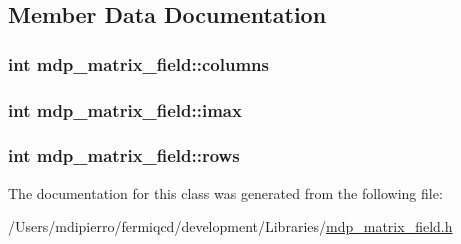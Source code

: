 \subsection{Member Data Documentation}
\hypertarget{classmdp__matrix__field_aed230e738036a9f78c46089fe3710a53}{
\subsubsection[{columns}]{\setlength{\rightskip}{0pt plus 5cm}int {\bf mdp\_\-matrix\_\-field::columns}}}
\label{classmdp__matrix__field_aed230e738036a9f78c46089fe3710a53}
\hypertarget{classmdp__matrix__field_a36e86a01ec41e2c0c67194091119c835}{
\subsubsection[{imax}]{\setlength{\rightskip}{0pt plus 5cm}int {\bf mdp\_\-matrix\_\-field::imax}}}
\label{classmdp__matrix__field_a36e86a01ec41e2c0c67194091119c835}
\hypertarget{classmdp__matrix__field_ac19f5807ad30e73c0362753a6b04c491}{
\subsubsection[{rows}]{\setlength{\rightskip}{0pt plus 5cm}int {\bf mdp\_\-matrix\_\-field::rows}}}
\label{classmdp__matrix__field_ac19f5807ad30e73c0362753a6b04c491}


The documentation for this class was generated from the following file:\begin{DoxyCompactItemize}
\item 
/Users/mdipierro/fermiqcd/development/Libraries/\hyperlink{mdp__matrix__field_8h}{mdp\_\-matrix\_\-field.h}\end{DoxyCompactItemize}
